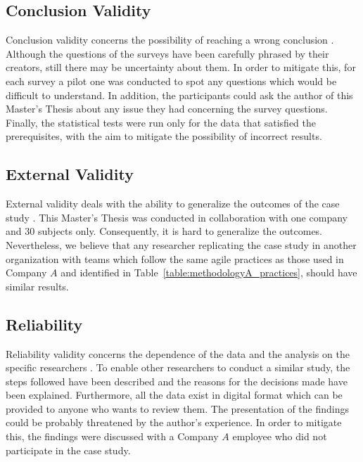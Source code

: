 \subsection{Conclusion Validity}
Conclusion validity concerns the possibility of reaching a wrong conclusion \cite{wohlin2012expse}. Although the questions of the surveys have been carefully phrased by their creators, still there may be uncertainty about them. In order to mitigate this, for each survey a pilot one was conducted to spot any questions which would be difficult to understand. In addition, the participants could ask the author of this Master's Thesis about any issue they had concerning the survey questions. Finally, the statistical tests were run only for the data that satisfied the prerequisites, with the aim to mitigate the possibility of incorrect results. %

\subsection{External Validity}
External validity deals with the ability to generalize the outcomes of the case study \cite{wohlin2012expse}. This Master's Thesis was conducted in collaboration with one company and 30 subjects only. Consequently, it is hard to generalize the outcomes. Nevertheless, we believe that any researcher replicating the case study in another organization with teams which follow the same agile practices as those used in Company $A$ and identified in Table~\ref{table:methodologyA_practices}, should have similar results.

\subsection{Reliability}
Reliability validity concerns the dependence of the data and the analysis on the specific researchers \cite{wohlin2012expse}. To enable other researchers to conduct a similar study, the steps followed have been described and the reasons for the decisions made have been explained. Furthermore, all the data exist in digital format which can be provided to anyone who wants to review them. The presentation of the findings could be probably threatened by the author's experience. In order to mitigate this, the findings were discussed with a Company $A$ employee who did not participate in the case study.





